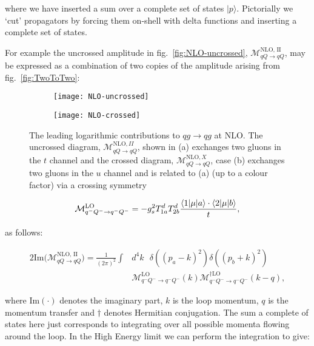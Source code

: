 	where we have inserted a sum over a complete set of states $|p\rangle$.  Pictorially we `cut' propagators
	by forcing them on-shell with delta functions and inserting a complete set of states.

	For example the uncrossed amplitude in fig.~\eqref{fig:NLO-uncrossed},
	$\mathcal{M}_{qQ\rightarrow qQ}^{\text{NLO, II}}$, may be expressed as a combination of
	two copies of the amplitude arising from fig.~\eqref{fig:TwoToTwo}:

	\begin{figure}[tpb]

		\centering
		\begin{subfigure}[b]{0.48\textwidth}
			\texttt{[image: NLO-uncrossed]}
			\caption{}
			\label{fig:NLO-uncrossed}
		\end{subfigure}
		\begin{subfigure}[b]{0.48\textwidth}
			\texttt{[image: NLO-crossed]}
			\caption{}
			\label{fig:NLO-crossed}
		\end{subfigure}
		\caption{The leading logarithmic contributions to $qg\rightarrow qg$ at NLO.  The uncrossed
			         diagram, $\mathcal{M}_{qQ\rightarrow qQ}^{\text{NLO}, II}$, shown in (a) exchanges
			         two gluons in the $t$ channel and the crossed diagram,
			         $\mathcal{M}_{qQ\rightarrow qQ}^{\text{NLO}, X}$, case (b) exchanges two gluons
			         in the $u$ channel and is related to (a) (up to a colour factor) via a crossing
			         symmetry}
		\label{fig:NLO-leadingContrib}
	\end{figure}

	\begin{equation}
		\mathcal{M}_{q^-Q^-\rightarrow q^-Q^-}^{\text{LO}} =
		-g_s^2T^d_{1a}T^d_{2b}\frac{\langle 1 | \mu | a \rangle\cdot\langle 2 | \mu | b \rangle}{t},
	\end{equation}

	as follows:

	\begin{align}
		2\text{Im}\Big(\mathcal{M}_{qQ\rightarrow qQ}^{\text{NLO, II}}\Big) =
		\frac{1}{(2\pi)^2}\int &d^4k\text{ }\delta((p_a-k)^2)
		\delta((p_b+k)^2)\\ &\mathcal{M}_{q^-Q^-\rightarrow q^-Q^-}^{\text{LO}}(k)
		\mathcal{M}_{q^-Q^-\rightarrow q^-Q^-}^{\dagger\text{LO}}(k-q),
	\end{align}

	where $\text{Im}(\cdot)$ denotes the imaginary part, $k$ is the loop momentum, $q$ is the momentum
	transfer and $\dagger$ denotes Hermitian conjugation.  The sum a complete of states here just
	corresponds to integrating over all possible momenta flowing around the loop. In the High Energy
	limit we can perform the integration to give:

